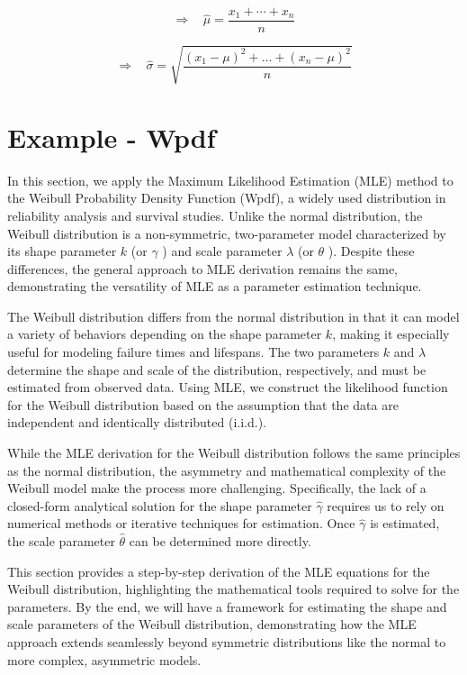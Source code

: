 \documentclass[
  12 pt,
  a4paper,
]{book}
\numberwithin{equation}{section}
\theoremstyle{plain}      %
\theoremstyle{definition} %
\theoremstyle{remark}     %
\theoremstyle{note}         %
\begin{document}
\[
\Rightarrow ~~~~ \widehat{\mu}=\frac{x_{1}+\cdots+x_{n}}{n}
\]

\[
\Rightarrow ~~~~ \widehat{\sigma}=\sqrt{\frac{\left(x_{1}-\mu\right)^{2}+\ldots+\left(x_{n}-\mu\right)^{2}}{n}}
\]

\newpage

\hypertarget{example---wpdf}{%
\section{Example - Wpdf}\label{example---wpdf}}

In this section, we apply the Maximum Likelihood Estimation (MLE) method
to the Weibull Probability Density Function (Wpdf), a widely used
distribution in reliability analysis and survival studies. Unlike the
normal distribution, the Weibull distribution is a non-symmetric,
two-parameter model characterized by its shape parameter \(k\) (or
\(\gamma\) ) and scale parameter \(\lambda\) (or \(\theta\) ). Despite
these differences, the general approach to MLE derivation remains the
same, demonstrating the versatility of MLE as a parameter estimation
technique.

The Weibull distribution differs from the normal distribution in that it
can model a variety of behaviors depending on the shape parameter \(k\),
making it especially useful for modeling failure times and lifespans.
The two parameters \(k\) and \(\lambda\) determine the shape and scale
of the distribution, respectively, and must be estimated from observed
data. Using MLE, we construct the likelihood function for the Weibull
distribution based on the assumption that the data are independent and
identically distributed (i.i.d.).

While the MLE derivation for the Weibull distribution follows the same
principles as the normal distribution, the asymmetry and mathematical
complexity of the Weibull model make the process more challenging.
Specifically, the lack of a closed-form analytical solution for the
shape parameter \(\hat{\gamma}\) requires us to rely on numerical
methods or iterative techniques for estimation. Once \(\hat{\gamma}\) is
estimated, the scale parameter \(\hat{\theta}\) can be determined more
directly.

This section provides a step-by-step derivation of the MLE equations for
the Weibull distribution, highlighting the mathematical tools required
to solve for the parameters. By the end, we will have a framework for
estimating the shape and scale parameters of the Weibull distribution,
demonstrating how the MLE approach extends seamlessly beyond symmetric
distributions like the normal to more complex, asymmetric models.
\end{document}
